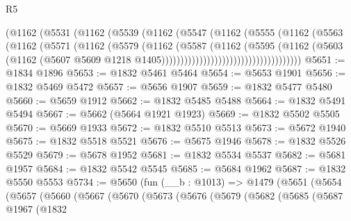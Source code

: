 \begin{lexlean}{R5}
\begin{coremodule}
                                  (@1162
                                    (@5531
                                      (@1162
                                        (@5539
                                          (@1162
                                            (@5547
                                              (@1162
                                                (@5555
                                                  (@1162
                                                    (@5563
                                                      (@1162
                                                        (@5571
                                                          (@1162
                                                            (@5579
                                                              (@1162
                                                                (@5587
                                                                  (@1162
                                                                    (@5595
                                                                      (@1162
                                                                        (@5603
                                                                          (@1162
                                                                            (@5607
                                                                              @5609
                                                                              @1218
                                                                              @1405)))))))))))))))))))))))))))))))))))))
@5651 := @1834 @1896
@5653 := @1832 @5461 @5464
@5654 := @5653 @1901
@5656 := @1832 @5469 @5472
@5657 := @5656 @1907
@5659 := @1832 @5477 @5480
@5660 := @5659 @1912
@5662 := @1832 @5485 @5488
@5664 := @1832 @5491 @5494
@5667 := @5662 (@5664 @1921 @1923)
@5669 := @1832 @5502 @5505
@5670 := @5669 @1933
@5672 := @1832 @5510 @5513
@5673 := @5672 @1940
@5675 := @1832 @5518 @5521
@5676 := @5675 @1946
@5678 := @1832 @5526 @5529
@5679 := @5678 @1952
@5681 := @1832 @5534 @5537
@5682 := @5681 @1957
@5684 := @1832 @5542 @5545
@5685 := @5684 @1962
@5687 := @1832 @5550 @5553
@5734 := @5650
    (fun (__b : @1013) =>
    @1479
      (@5651
        (@5654
          (@5657
            (@5660
              (@5667
                (@5670
                  (@5673
                    (@5676
                      (@5679
                        (@5682
                          (@5685
                            (@5687
                              @1967
                              (@1832

\end{coremodule}
\end{lexlean}
